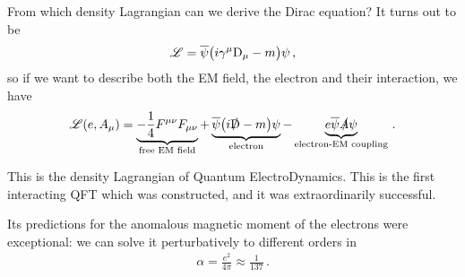 \documentclass[main.tex]{subfiles}
\begin{document}
From which density Lagrangian can we derive the Dirac equation? It turns out to be 
%
\begin{align}
\mathscr{L} = \overline{\psi} \qty(i \gamma^{\mu } \mathrm{D}_{\mu } -m ) \psi 
\,,
\end{align}
%
so if we want to describe both the EM field, the electron and their interaction, we have 
%
\begin{align}
\mathscr{L} (e, A_{\mu }) = 
\underbrace{- \frac{1}{4} F^{\mu \nu } F_{\mu \nu }}_{\text{free EM field}} + \underbrace{\overline{\psi} \qty(i \slashed{\mathrm{D}} - m) \psi}_{\text{electron}} 
- \underbrace{e\overline{\psi} \slashed{A} \psi}_{\text{electron-EM coupling}} 
\,.
\end{align}

This is the density Lagrangian of Quantum ElectroDynamics. 
This is the first interacting QFT which was constructed, and it was extraordinarily successful. 

Its predictions for the anomalous magnetic moment of the electrons were exceptional: we can solve it perturbatively to different orders in 
%
\begin{align}
\alpha = \frac{e^2}{4 \pi } \approx \frac{1}{137}
\,.
\end{align}
\end{document}
